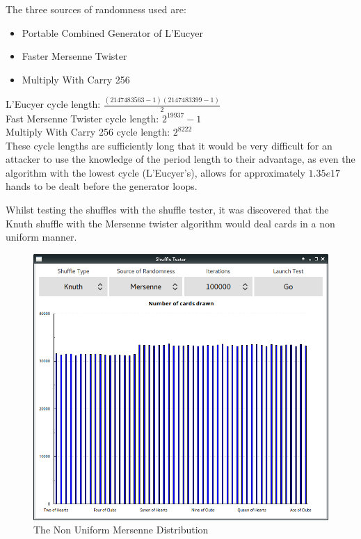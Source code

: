The three sources of randomness used are:

\begin{itemize}
    \item Portable Combined Generator of L'Eucyer \parencite{leucyer1988}
    \item Faster Mersenne Twister \parencite{matsumoto1998,saito2008}
    \item Multiply With Carry 256 \parencite{marsaglia2003}
\end{itemize}

L'Eucyer cycle length: $ \displaystyle \frac{(2147483563-1)(2147483399-1)}{2}$\\

Fast Mersenne Twister cycle length: $ \displaystyle {2}^{19937}-1$\\

Multiply With Carry 256 cycle length: $ \displaystyle {2}^{8222}$\\

These cycle lengths are sufficiently long that it would be very difficult
for an attacker to use the knowledge of the period length to their advantage,
as even the algorithm with the lowest cycle (L'Eucyer's), allows for
approximately $1.35e17$ hands to be dealt before the generator loops.

Whilst testing the shuffles with the shuffle tester, it was discovered that
the Knuth shuffle with the Mersenne twister algorithm would deal cards in a
non uniform manner.

\begin{figure}[H]
    \centering
    \includegraphics[width=0.8\linewidth]{../images/faultymersenne.png}
    \caption{The Non Uniform Mersenne Distribution}%
    \label{fig:faultymersenne}
\end{figure}

